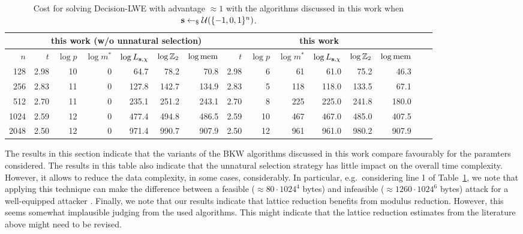 \begin{table}
\centering{}
\begin{tabular}{|r||r|r|r|r|r|r||r|r|r|r|r|r|r|r|}
\hline
   & \multicolumn{6}{|c||}{this work (w/o unnatural selection)} & \multicolumn{6}{|c|}{this work}\\
\hline
$n$ & $t$ & $\log p$ & $\log m^\ast$ & $\log L_{\mathbf{s},\chi}$ & $\log \mathbb{Z}_2$ & $\log \textnormal{mem}$ & $t$ & $\log p$ & $\log m^\ast$ & $\log L_{\mathbf{s},\chi}$ & $\log \mathbb{Z}_2$ & $\log \textnormal{mem}$ \\
\hline
  128 &  2.98 & 10 &    0 &     64.7 &     78.2 &     70.8 & 2.98 &  6 &   61 &     61.0 &     75.2 &     46.3\\ %
  256 &  2.83 & 11 &    0 &    127.8 &    142.7 &    134.9 & 2.83 &  5 &  118 &    118.0 &    133.5 &     67.1 \\ %
  512 &  2.70 & 11 &    0 &    235.1 &    251.2 &    243.1 & 2.70 &  8 &  225 &    225.0 &    241.8 &    180.0 \\ %
 1024 &  2.59 & 12 &    0 &    477.4 &    494.8 &    486.5 & 2.59 & 10 &  467 &    467.0 &    485.0 &    407.5 \\ %
 2048 &  2.50 & 12 &    0 &    971.4 &    990.7 &    907.9 & 2.50 & 12 &  961 &    961.0 &    980.2 &    907.9 \\ %
\hline
\end{tabular}
\caption{Cost for solving Decision-LWE with advantage $\approx 1$ with the algorithms discussed in this work when $\mathbf{s} \leftarrow_{\$} \mathcal{U}(\{-1,0,1\}^n)$.}
\label{tab:thiswork2}
\end{table}

The results in this section indicate that the variants of the BKW algorithms discussed in this work compare favourably for the paramters considered.  The results in this table also indicate that the unnatural selection strategy has little impact on the overall time complexity. However, it allows to reduce the data complexity, in some cases, considerably. In particular, e.g.\ considering line 1 of Table~\ref{tab:thiswork2}, we note that applying this technique can make the difference between a feasible ($\approx 80 \cdot 1024^4$ bytes) and infeasible ($\approx 1260 \cdot 1024^6$ bytes) attack for a well-equipped attacker \cite{utah-data-centre}. Finally, we note that our results indicate that lattice reduction benefits from modulus reduction. However, this seems somewhat implausible judging from the used algorithms. This might indicate that the lattice reduction estimates from the literature  above might need to be revised.

